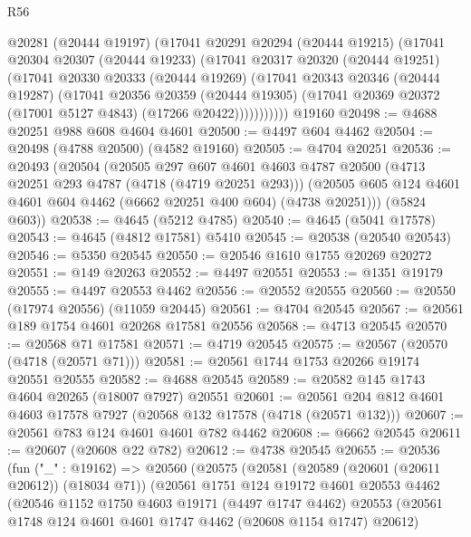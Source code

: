 \begin{lexlean}{R56}
\begin{coremodule}
          @20281
          (@20444 @19197)
          (@17041
            @20291
            @20294
            (@20444 @19215)
            (@17041
              @20304
              @20307
              (@20444 @19233)
              (@17041
                @20317
                @20320
                (@20444 @19251)
                (@17041
                  @20330
                  @20333
                  (@20444 @19269)
                  (@17041
                    @20343
                    @20346
                    (@20444 @19287)
                    (@17041
                      @20356
                      @20359
                      (@20444 @19305)
                      (@17041 @20369 @20372 (@17001 @5127 @4843) (@17266 @20422)))))))))))
    @19160
@20498 := @4688 @20251 @988 @608 @4604 @4601
@20500 := @4497 @604 @4462
@20504 := @20498 (@4788 @20500) (@4582 @19160)
@20505 := @4704 @20251
@20536 := @20493
    (@20504
      (@20505
        @297
        @607
        @4601
        @4603
        @4787
        @20500
        (@4713 @20251 @293 @4787 (@4718 (@4719 @20251 @293)))
        (@20505 @605 @124 @4601 @4601 @604 @4462 (@6662 @20251 @400 @604) (@4738 @20251)))
      (@5824 @603))
@20538 := @4645 (@5212 @4785)
@20540 := @4645 (@5041 @17578)
@20543 := @4645 (@4812 @17581) @5410
@20545 := @20538 (@20540 @20543)
@20546 := @5350 @20545
@20550 := @20546 @1610 @1755 @20269 @20272
@20551 := @149 @20263
@20552 := @4497 @20551
@20553 := @1351 @19179
@20555 := @4497 @20553 @4462
@20556 := @20552 @20555
@20560 := @20550 (@17974 @20556) (@11059 @20445)
@20561 := @4704 @20545
@20567 := @20561 @189 @1754 @4601 @20268 @17581 @20556
@20568 := @4713 @20545
@20570 := @20568 @71 @17581
@20571 := @4719 @20545
@20575 := @20567 (@20570 (@4718 (@20571 @71)))
@20581 := @20561 @1744 @1753 @20266 @19174 @20551 @20555
@20582 := @4688 @20545
@20589 := @20582 @145 @1743 @4604 @20265 (@18007 @7927) @20551
@20601 := @20561 @204 @812 @4601 @4603 @17578 @7927 (@20568 @132 @17578 (@4718 (@20571 @132)))
@20607 := @20561 @783 @124 @4601 @4601 @782 @4462
@20608 := @6662 @20545
@20611 := @20607 (@20608 @22 @782)
@20612 := @4738 @20545
@20655 := @20536
    (fun ("_" : @19162) =>
    @20560
      (@20575
        (@20581
          (@20589 (@20601 (@20611 @20612)) (@18034 @71))
          (@20561
            @1751
            @124
            @19172
            @4601
            @20553
            @4462
            (@20546
              @1152
              @1750
              @4603
              @19171
              (@4497 @1747 @4462)
              @20553
              (@20561 @1748 @124 @4601 @4601 @1747 @4462 (@20608 @1154 @1747) @20612)

\end{coremodule}
\end{lexlean}
